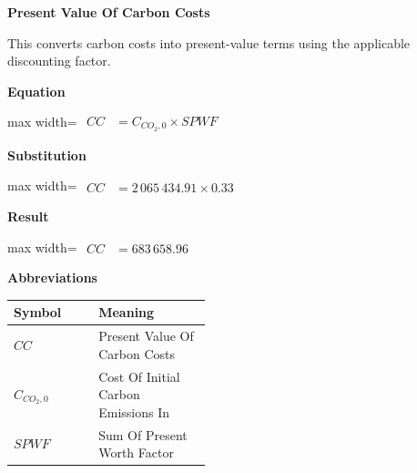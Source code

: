 \documentclass{article}
\begin{document}
\vspace{0.6em}
\vspace{0.4em}
\textbf{Present Value Of Carbon Costs}\par\vspace{-0.35em}
This converts carbon costs into present-value terms using the applicable discounting factor.

\vspace{0.4em}
\textbf{Equation}\par\vspace{-0.35em}
\begin{center}
\begin{adjustbox}{max width=\linewidth}
$\displaystyle\begin{aligned}
CC &= C_{CO_2,0} \times SPWF
\end{aligned}$
\end{adjustbox}
\end{center}
\vspace{0.4em}
\textbf{Substitution}\par\vspace{-0.35em}
\begin{center}
\begin{adjustbox}{max width=\linewidth}
$\displaystyle\begin{aligned}
CC &= 2\,065\,434.91 \times 0.33
\end{aligned}$
\end{adjustbox}
\end{center}
\vspace{0.4em}
\textbf{Result}\par\vspace{-0.35em}
\begin{center}
\begin{adjustbox}{max width=\linewidth}
$\displaystyle\begin{aligned}
CC &= 683\,658.96
\end{aligned}$
\end{adjustbox}
\end{center}
\vspace{0.4em}
\textbf{Abbreviations}\par\vspace{-0.35em}
\begin{tabularx}{\linewidth}{>{\raggedright\arraybackslash}p{0.43\linewidth} >{\raggedright\arraybackslash}X}
\toprule
Symbol & Meaning \\
\midrule
$CC$ & Present Value Of Carbon Costs \\
$C_{CO_2,0}$ & Cost Of Initial Carbon Emissions In \\
$SPWF$ & Sum Of Present Worth Factor \\
\bottomrule
\end{tabularx}
\end{document}
